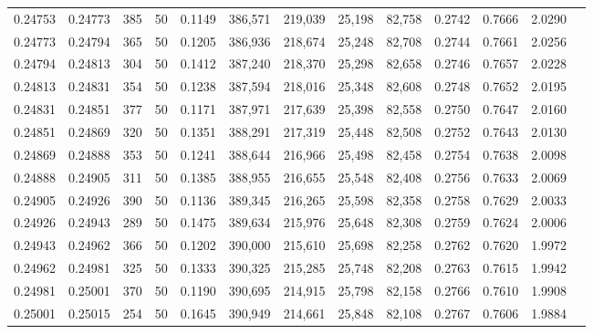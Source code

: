 \begin{tabular}{rrrrrrrrrrrrr}
0.24753 & 0.24773 &   385 &  50 &                                     0.1149 & 386,571 & 219,039 &  25,198 &  82,758 & 0.2742 & 0.7666 & 2.0290 \\
0.24773 & 0.24794 &   365 &  50 &                                     0.1205 & 386,936 & 218,674 &  25,248 &  82,708 & 0.2744 & 0.7661 & 2.0256 \\
0.24794 & 0.24813 &   304 &  50 &                                     0.1412 & 387,240 & 218,370 &  25,298 &  82,658 & 0.2746 & 0.7657 & 2.0228 \\
0.24813 & 0.24831 &   354 &  50 &                                     0.1238 & 387,594 & 218,016 &  25,348 &  82,608 & 0.2748 & 0.7652 & 2.0195 \\
0.24831 & 0.24851 &   377 &  50 &                                     0.1171 & 387,971 & 217,639 &  25,398 &  82,558 & 0.2750 & 0.7647 & 2.0160 \\
0.24851 & 0.24869 &   320 &  50 &                                     0.1351 & 388,291 & 217,319 &  25,448 &  82,508 & 0.2752 & 0.7643 & 2.0130 \\
0.24869 & 0.24888 &   353 &  50 &                                     0.1241 & 388,644 & 216,966 &  25,498 &  82,458 & 0.2754 & 0.7638 & 2.0098 \\
0.24888 & 0.24905 &   311 &  50 &                                     0.1385 & 388,955 & 216,655 &  25,548 &  82,408 & 0.2756 & 0.7633 & 2.0069 \\
0.24905 & 0.24926 &   390 &  50 &                                     0.1136 & 389,345 & 216,265 &  25,598 &  82,358 & 0.2758 & 0.7629 & 2.0033 \\
0.24926 & 0.24943 &   289 &  50 &                                     0.1475 & 389,634 & 215,976 &  25,648 &  82,308 & 0.2759 & 0.7624 & 2.0006 \\
0.24943 & 0.24962 &   366 &  50 &                                     0.1202 & 390,000 & 215,610 &  25,698 &  82,258 & 0.2762 & 0.7620 & 1.9972 \\
0.24962 & 0.24981 &   325 &  50 &                                     0.1333 & 390,325 & 215,285 &  25,748 &  82,208 & 0.2763 & 0.7615 & 1.9942 \\
0.24981 & 0.25001 &   370 &  50 &                                     0.1190 & 390,695 & 214,915 &  25,798 &  82,158 & 0.2766 & 0.7610 & 1.9908 \\
0.25001 & 0.25015 &   254 &  50 &                                     0.1645 & 390,949 & 214,661 &  25,848 &  82,108 & 0.2767 & 0.7606 & 1.9884 \\

\end{tabular}
